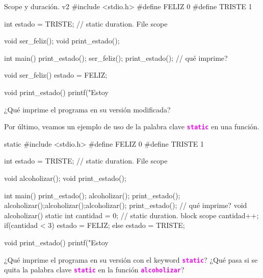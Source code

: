 \documentclass[]{scrartcl}
\newcommand{\hl}[1]{\textcolor{magenta}{\textbf{\texttt{#1}}}}
\begin{document}
\begin{cbox}[]{Scope y duración. v2}
  #include <stdio.h>
  #define FELIZ 0
  #define TRISTE 1
  
  int estado = TRISTE; // static duration. File scope
  
  void ser_feliz();
  void print_estado();
  
  int main(){
    print_estado();
    ser_feliz();
    print_estado(); // qué imprime?
  }
  
  void ser_feliz(){
    estado = FELIZ;
  }
  
  void print_estado(){
    printf("Estoy %
  }
\end{cbox}

\begin{exbox}
  ¿Qué imprime el programa en su versión modificada? 
\end{exbox}


Por último, veamos un ejemplo de uso de la palabra clave \hl{static} en una función.

\begin{cbox}[]{static}
  #include <stdio.h>
  #define FELIZ 0
  #define TRISTE 1

  int estado = TRISTE; // static duration. File scope
  
  void alcoholizar();
  void print_estado();
  
  int main(){
    print_estado();
    alcoholizar();
    print_estado();
    alcoholizar();alcoholizar();alcoholizar();
    print_estado(); // qué imprime?
  }
  void alcoholizar(){
    static int cantidad = 0; // static duration. block scope
    cantidad++;
    if(cantidad < 3){
      estado = FELIZ;
    }else{
      estado = TRISTE;
    }
  }
  
  void print_estado(){
    printf("Estoy %
  }
\end{cbox}

\begin{exbox}
  ¿Qué imprime el programa en su versión con el keyword \hl{static}? ¿Qué pasa si se quita la palabra clave \hl{static} en la función \hl{alcoholizar}?
\end{exbox}
\end{document}
